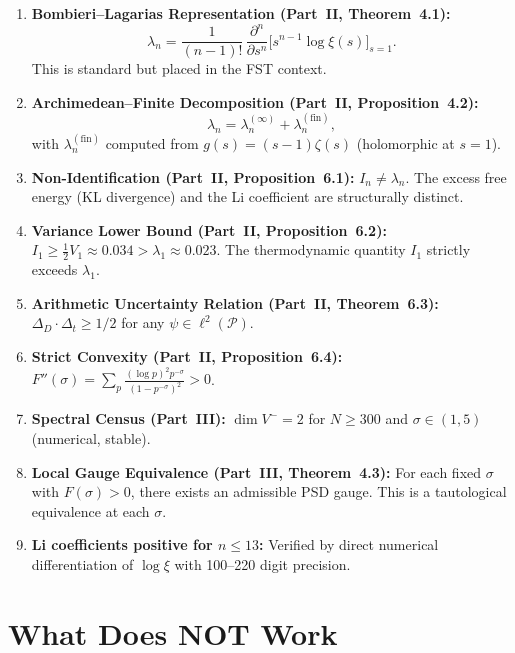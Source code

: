 \documentclass[12pt,a4paper]{article}
\theoremstyle{definition}
\theoremstyle{remark}
\newcommand{\PP}{\mathcal{P}}
\begin{document}
\begin{enumerate}[label=(R\arabic*)]
  \item \textbf{Bombieri--Lagarias Representation (Part~II, Theorem~4.1):}
  \[ \lambda_n = \frac{1}{(n-1)!}\,\frac{\partial^n}{\partial s^n}\Big[s^{n-1}\log\xi(s)\Big]_{s=1}. \]
  This is standard \cite{BombieriLagarias1999} but placed in the FST context.

  \item \textbf{Archimedean--Finite Decomposition (Part~II, Proposition~4.2):}
  \[ \lambda_n = \lambda_n^{(\infty)} + \lambda_n^{(\mathrm{fin})}, \]
  with $\lambda_n^{(\mathrm{fin})}$ computed from $g(s) = (s-1)\zeta(s)$ (holomorphic at $s=1$).

  \item \textbf{Non-Identification (Part~II, Proposition~6.1):} $I_n \neq \lambda_n$. The excess free energy (KL divergence) and the Li coefficient are structurally distinct.

  \item \textbf{Variance Lower Bound (Part~II, Proposition~6.2):} $I_1 \geq \frac{1}{2}V_1 \approx 0.034 > \lambda_1 \approx 0.023$. The thermodynamic quantity $I_1$ strictly exceeds $\lambda_1$.

  \item \textbf{Arithmetic Uncertainty Relation (Part~II, Theorem~6.3):} $\Delta_D \cdot \Delta_t \geq 1/2$ for any $\psi \in \ell^2(\PP)$.

  \item \textbf{Strict Convexity (Part~II, Proposition~6.4):} $F''(\sigma) = \sum_p \frac{(\log p)^2 p^{-\sigma}}{(1-p^{-\sigma})^2} > 0$.

  \item \textbf{Spectral Census (Part~III):} $\dim V^- = 2$ for $N \geq 300$ and $\sigma \in (1, 5)$ (numerical, stable).

  \item \textbf{Local Gauge Equivalence (Part~III, Theorem~4.3):} For each fixed $\sigma$ with $F(\sigma) > 0$, there exists an admissible PSD gauge. This is a tautological equivalence at each $\sigma$.

  \item \textbf{Li coefficients positive for $n \leq 13$:} Verified by direct numerical differentiation of $\log\xi$ with 100--220 digit precision.
\end{enumerate}


\section{What Does NOT Work}
\end{document}
